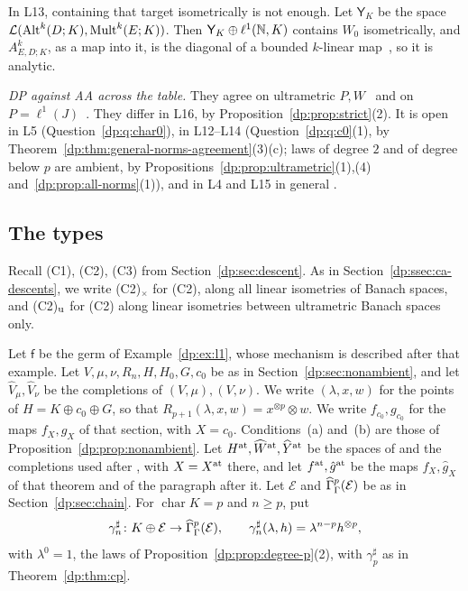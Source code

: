 In L13, containing that target isometrically is not enough. Let $\mathsf Y_K$ be the space $\mathcal L(\operatorname{Alt}^k(D;K),\operatorname{Mult}^k(E;K))$. Then $\mathsf Y_K\oplus\ell^1(\mathbb N,K)$ contains $W_0$ isometrically, and $A^k_{E,D;K}$, as a map into it, is the diagonal of a bounded $k$\nobreakdash-linear map~\cite[Proposition~2.2]{I}, so it is analytic.

\emph{DP against AA across the table.} They agree on ultrametric $P,W$~\cite[Theorem~14.39(1)]{I} and on $P=\ell^1(J)$~\cite[Theorem~14.39(2)]{I}. They differ in L16, by Proposition~\ref{dp:prop:strict}(2). It is open in L5 (Question~\ref{dp:q:char0}), in L12--L14 (Question~\ref{dp:q:c0}(1), by Theorem~\ref{dp:thm:general-norms-agreement}(3)(c); laws of degree $2$ and of degree below $p$ are ambient, by Propositions~\ref{dp:prop:ultrametric}(1),(4) and~\ref{dp:prop:all-norms}(1)), and in L4 and L15 in general \cite[Question~14.42(4)]{I}.

\subsection{The types}\label{dp:ssec:types}

Recall (C1), (C2), (C3) from Section~\ref{dp:sec:descent}. As in Section~\ref{dp:ssec:ca-descents}, we write (C2)$_\times$ for (C2), along all linear isometries of Banach spaces, and (C2)$_{\rm u}$ for (C2) along linear isometries between ultrametric Banach spaces only.

Let $\mathsf f$ be the germ of Example~\ref{dp:ex:l1}, whose mechanism is described after that example. Let $V,\mu,\nu,R_n,H,H_0,G,c_0$ be as in Section~\ref{dp:sec:nonambient}, and let $\widehat V_\mu,\widehat V_\nu$ be the completions of $(V,\mu),(V,\nu)$. We write $(\lambda,x,w)$ for the points of $H=K\oplus c_0\oplus G$, so that $R_{p+1}(\lambda,x,w)=x^{\otimes p}\otimes w$. We write $f_{c_0},g_{c_0}$ for the maps $f_X,g_X$ of that section, with $X=c_0$. Conditions~(a) and~(b) are those of Proposition~\ref{dp:prop:nonambient}. Let $H^{\rm at},\widehat W^{\rm at},\widehat Y^{\rm at}$ be the spaces of \cite[Definition~14.16]{I} and the completions used after \cite[Theorem~14.17]{I}, with $X=X^{\rm at}$ there, and let $f^{\rm at},\hat g^{\rm at}$ be the maps $f_X,\hat g_X$ of that theorem and of the paragraph after it. Let $\mathcal E$ and $\widehat\Gamma^p_\Gamma(\mathcal E)$ be as in Section~\ref{dp:sec:chain}. For $\operatorname{char}K=p$ and $n\ge p$, put
\[
 \gamma^\sharp_n\colon K\oplus\mathcal E\to\widehat\Gamma^p_\Gamma(\mathcal E),\qquad\gamma^\sharp_n(\lambda,h)=\lambda^{n-p}h^{\otimes p},
\]
with $\lambda^0=1$, the laws of Proposition~\ref{dp:prop:degree-p}(2), with $\gamma^\sharp_p$ as in Theorem~\ref{dp:thm:cp}.

